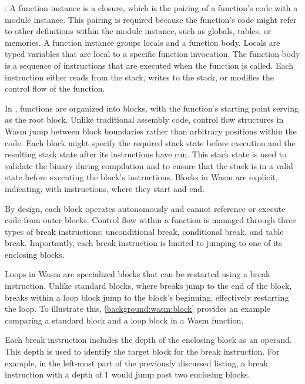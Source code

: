 : A function instance is a closure, which is the pairing of a function's code with a module instance. This pairing is required because the function's code might refer to other definitions within the module instance, such as globals, tables, or memories.
A function instance groups locals and a function body.
Locals are typed variables that are local to a specific function invocation.
The function body is a sequence of instructions that are executed when the function is called.
Each instruction either reads from the stack, writes to the stack, or modifies the control flow of the function.


In \Wasm, functions are organized into blocks, with the function's starting point serving as the root block. 
Unlike traditional assembly code, control flow structures in Wasm jump between block boundaries rather than arbitrary positions within the code. 
Each block might specify the required stack state before execution and the resulting stack state after its instructions have run. 
This stack state is used to validate the binary during compilation and to ensure that the stack is in a valid state before executing the block's instructions.
Blocks in Wasm are explicit, indicating, with instructions, where they start and end.

By design, each block operates autonomously and cannot reference or execute code from outer blocks. 
Control flow within a function is managed through three types of break instructions: unconditional break, conditional break, and table break. 
Importantly, each break instruction is limited to jumping to one of its enclosing blocks.

Loops in Wasm are specialized blocks that can be restarted using a break instruction. Unlike standard blocks, where breaks jump to the end of the block, breaks within a loop block jump to the block's beginning, effectively restarting the loop. 
To illustrate this, \autoref{background:wasm:block} provides an example comparing a standard block and a loop block in a Wasm function.



Each break instruction includes the depth of the enclosing block as an operand. 
This depth is used to identify the target block for the break instruction. 
For example, in the left-most part of the previously discussed listing, a break instruction with a depth of 1 would jump past two enclosing blocks.


